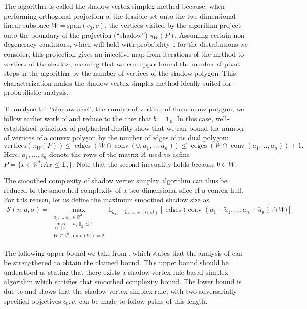 \documentclass{article}\usepackage[a4paper,margin=20mm]{geometry}
\newcommand{\R}{\mathbb R}
\newcommand{\E}{\mathbb E}
\newcommand{\conv}{\operatorname{conv}}
\newcommand{\edges}{\operatorname{edges}}
\renewcommand{\subset}{\subseteq}
\begin{document}
The algorithm is called the shadow vertex simplex method because, when performing orthogonal
projection of the feasible set onto the two-dimensional linear subspace $W = \mathrm{span}(c_0, c)$, the
vertices visited by the algorithm project onto the boundary of the projection (``shadow'')
$\pi_W(P)$. Assuming certain non-degeneracy conditions, which will hold with probability $1$ for the distributions
we consider, this projection gives an injective map from iterations of the
method to vertices of the shadow, meaning that we can
upper bound the number of pivot steps in the algorithm by the number of
vertices of the shadow polygon. 
This characterization makes the shadow vertex simplex method ideally suited for
probabilistic analysis.

To analyse the ``shadow size'', the number of vertices of the shadow polygon,
we follow earlier work of \cite{ver09} and reduce to the case that $b=\mathbf 1_n$.
In this case, well-established principles of polyhedral duality show that
we can bound the number of vertices of a convex polygon by the number of edges of its dual polygon:
\[
    \text{vertices}(\pi_W(P)) \leq \edges(W \cap \conv(0,a_1,\dots,a_n)) \leq \edges(W \cap \conv(a_1,\dots,a_n))+1.
\]
Here, $a_1,\dots,a_n$ denote the rows of the matrix $A$ used to define
$P = \{x \in \R^d : Ax \leq \mathbf 1_n\}$.
Note that the second inequality holds because $0 \in W$.

The smoothed complexity of shadow vertex simplex algorithm can thus be reduced to the
smoothed complexity of a two-dimensional slice of a convex hull.
For this reason, let us define the maximum smoothed shadow size as
\begin{align}\label{eq:def-shadow-bound}
    \mathcal{S}(n, d,\sigma) = \max_{\substack{\bar{a}_1, \ldots, \bar{a}_n \in \R^d \\ \max_{i \in [n]} \|\bar{a}_i\|_2 \leq 1 \\ W \subset \R^d, \dim(W) = 2}} \E_{\tilde{a}_1, \ldots, \tilde{a}_n \sim \mathcal{N}(0,\sigma^2)} \left[ \edges\big( \conv(\bar{a}_1 + \tilde{a}_1, \ldots, \bar{a}_n + \tilde{a}_n) \cap W\big)\right]
\end{align}


The following upper bound we take from \cite{DH18}, which states that the analysis of \cite{ver09}
can be strengthened to obtain the claimed bound. This upper bound should be understood
as stating that there exists a shadow vertex rule based simplex algorithm which
satisfies that smoothed complexity bound.
The lower bound is due to \cite{b87} and shows that the shadow vertex simplex rule, with
two adversarially specified objectives $c_0, c$,
can be made to follow paths of this length.
\end{document}
